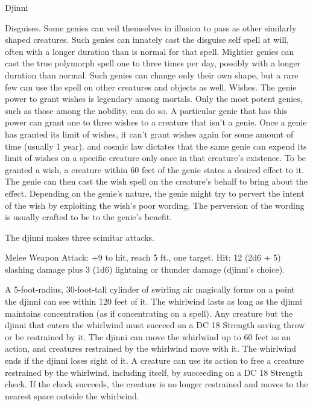 \begin{monsterbox}{Djinni}
\begin{monsteraction}
Disguises.
Some genies can veil themselves in illusion to pass as other similarly shaped creatures. Such genies can innately cast the disguise self spell at will, often with a longer duration than is normal for that spell. Mightier genies can cast the true polymorph spell one to three times per day, possibly with a longer duration than normal. Such genies can change only their own shape, but a rare few can use the spell on other creatures and objects as well.
Wishes.
The genie power to grant wishes is legendary among mortals. Only the most potent genies, such as those among the nobility, can do so. A particular genie that has this power can grant one to three wishes to a creature that isn't a genie. Once a genie has granted its limit of wishes, it can't grant wishes again for some amount of time (usually 1 year). and cosmic law dictates that the same genie can expend its limit of wishes on a specific creature only once in that creature's existence.
To be granted a wish, a creature within 60 feet of the genie states a desired effect to it. The genie can then cast the wish spell on the creature's behalf to bring about the effect. Depending on the genie's nature, the genie might try to pervert the intent of the wish by exploiting the wish's poor wording. The perversion of the wording is usually crafted to be to the genie's benefit.
\end{monsteraction}
\begin{monsteraction}[Multiattack]
The djinni makes three scimitar attacks.
\end{monsteraction}
\begin{monsteraction}[Scimitar]
Melee Weapon Attack: +9 to hit, reach 5 ft., one target. Hit: 12 (2d6 + 5) slashing damage plus 3 (1d6) lightning or thunder damage (djinni's choice).
\end{monsteraction}
\begin{monsteraction}
A 5-foot-radius, 30-foot-tall cylinder of swirling air magically forms on a point the djinni can see within 120 feet of it. The whirlwind lasts as long as the djinni maintains concentration (as if concentrating on a spell). Any creature but the djinni that enters the whirlwind must succeed on a DC 18 Strength saving throw or be restrained by it. The djinni can move the whirlwind up to 60 feet as an action, and creatures restrained by the whirlwind move with it. The whirlwind ends if the djinni loses sight of it.
A creature can use its action to free a creature restrained by the whirlwind, including itself, by succeeding on a DC 18 Strength check. If the check succeeds, the creature is no longer restrained and moves to the nearest space outside the whirlwind.
\end{monsteraction}
\end{monsterbox}